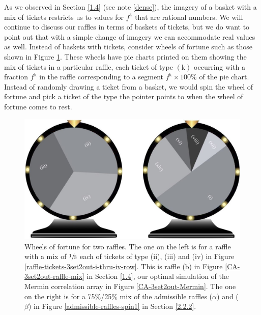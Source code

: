 As we observed in Section \ref{1.4} (see note \ref{dense}), the imagery of a basket with a mix of tickets restricts us to values for $f^{\mathrm{k}}$ that are rational numbers. We will continue to discuss our raffles in terms of baskets of tickets, but we do want to point out that with a simple change of imagery we can accommodate real values as well. Instead of  baskets with tickets, consider wheels of fortune such as those shown in Figure \ref{wheelsoffortune}. These wheels have pie charts printed on them showing the mix of tickets in a particular raffle, each ticket of type $(\mathrm{k})$ occurring with a fraction $f^{\mathrm{k}}$ in the raffle corresponding to a segment $f^{\mathrm{k}} \times 100\%$ of the pie chart. Instead of randomly drawing a ticket from a basket, we would spin the wheel of fortune and pick a ticket of the type the pointer points to when the wheel of fortune comes to rest.   
          
\begin{figure}[h]
 \centering
   \includegraphics[width=4.5in]{wheelsoffortune.jpeg} 
   \caption{Wheels of fortune for two raffles. The one on the left is for a raffle with a mix of $\sfrac13$ each of tickets of type (ii), (iii) and (iv) in Figure \ref{raffle-tickets-3set2out-i-thru-iv-row}. This is raffle (b) in Figure \ref{CA-3set2out-raffle-mix} in Section \ref{1.4}, our optimal simulation of the Mermin correlation array in Figure \ref{CA-3set2out-Mermin}. The one on the right is for a 75\%/25\% mix of the admissible raffles ($\alpha$) and ($\beta$) in Figure \ref{admissible-raffles-spin1} in Section \ref{2.2.2}.}
   \label{wheelsoffortune}
   \end{figure}  


